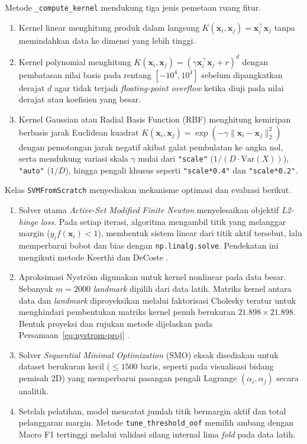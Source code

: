 Metode \texttt{\_compute\_kernel} mendukung tiga jenis pemetaan ruang fitur.
\begin{enumerate}
    \item Kernel linear menghitung produk dalam langsung $K(\mathbf{x}_i, \mathbf{x}_j) = \mathbf{x}_i^\top \mathbf{x}_j$ tanpa memindahkan data ke dimensi yang lebih tinggi.
    \item Kernel polynomial menghitung $K(\mathbf{x}_i, \mathbf{x}_j) = (\gamma \mathbf{x}_i^\top \mathbf{x}_j + r)^d$ dengan pembatasan nilai basis pada rentang $[-10^4, 10^4]$ sebelum dipangkatkan derajat $d$ agar tidak terjadi \textit{floating-point overflow} ketika diuji pada nilai derajat atau koefisien yang besar.
    \item Kernel Gaussian atau Radial Basis Function (RBF) menghitung kemiripan berbasis jarak Euclidean kuadrat $K(\mathbf{x}_i, \mathbf{x}_j) = \exp(-\gamma \|\mathbf{x}_i - \mathbf{x}_j\|_2^2)$ dengan pemotongan jarak negatif akibat galat pembulatan ke angka nol, serta mendukung variasi skala $\gamma$ mulai dari \texttt{"scale"} ($1 / (D \cdot \mathrm{Var}(X))$), \texttt{"auto"} ($1/D$), hingga pengali khusus seperti \texttt{"scale*0.4"} dan \texttt{"scale*0.2"}.
\end{enumerate}

Kelas \texttt{SVMFromScratch} menyediakan mekanisme optimasi dan evaluasi berikut.
\begin{enumerate}
    \item Solver utama \textit{Active-Set Modified Finite Newton} menyelesaikan objektif \textit{L2-hinge loss}. Pada setiap iterasi, algoritma mengambil titik yang melanggar margin ($y_i f(\mathbf{x}_i) < 1$), membentuk sistem linear dari titik aktif tersebut, lalu memperbarui bobot dan bias dengan \texttt{np.linalg.solve}. Pendekatan ini mengikuti metode Keerthi dan DeCoste \cite{keerthi2005newton}.
    \item Aproksimasi Nystr\"om digunakan untuk kernel nonlinear pada data besar. Sebanyak $m=2000$ \textit{landmark} dipilih dari data latih. Matriks kernel antara data dan \textit{landmark} diproyeksikan melalui faktorisasi Cholesky teratur untuk menghindari pembentukan matriks kernel penuh berukuran $21.898 \times 21.898$. Bentuk proyeksi dan rujukan metode dijelaskan pada Persamaan~\ref{eq:nystrom-proj} \cite{williams2001nystrom}.
    \item Solver \textit{Sequential Minimal Optimization} (SMO) eksak disediakan untuk dataset berukuran kecil ($\le 1500$ baris, seperti pada visualisasi bidang pemisah 2D) yang memperbarui pasangan pengali Lagrange $(\alpha_i, \alpha_j)$ secara analitik.
    \item Setelah pelatihan, model mencatat jumlah titik bermargin aktif dan total pelanggaran margin. Metode \texttt{tune\_threshold\_oof} memilih ambang dengan Macro F1 tertinggi melalui validasi silang internal lima \textit{fold} pada data latih.
\end{enumerate}

